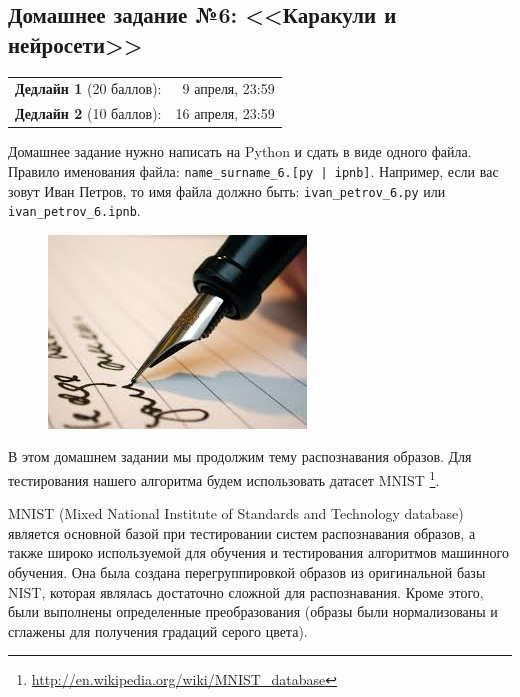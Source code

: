 \documentclass[a4paper,12pt]{article}
\begin{document}
\subsection*{Домашнее задание №6: <<Каракули и нейросети>>}

\begin{tabular}{@{}lr}
  \textbf{Дедлайн 1} (20 баллов): & 9 апреля, 23:59 \\
  \textbf{Дедлайн 2} (10 баллов): & 16 апреля, 23:59
\end{tabular}

Домашнее задание нужно написать на Python и сдать в виде одного файла.
Правило именования файла: \texttt{name\_surname\_6.[py | ipnb]}. Например, если
вас зовут Иван Петров, то имя файла должно быть: \texttt{ivan\_petrov\_6.py} или \texttt{ivan\_petrov\_6.ipnb}.

\makebox[\linewidth]{\hrulefill}

\begin{figure}[h!]
  \centering
  \includegraphics[width=.7\linewidth]{images/images}
\end{figure}


В этом домашнем задании мы продолжим тему распознавания образов. Для тестирования нашего алгоритма будем использовать датасет MNIST \footnote{\url{http://en.wikipedia.org/wiki/MNIST_database}}. 

MNIST (Mixed National Institute of Standards and Technology database) является основной базой при тестировании систем распознавания образов, а также широко используемой для обучения и тестирования алгоритмов машинного обучения. Она была создана перегруппировкой образов из оригинальной базы NIST, которая являлась достаточно сложной для распознавания. Кроме этого, были выполнены определенные преобразования (образы были нормализованы и сглажены для получения градаций серого цвета). 
\end{document}
